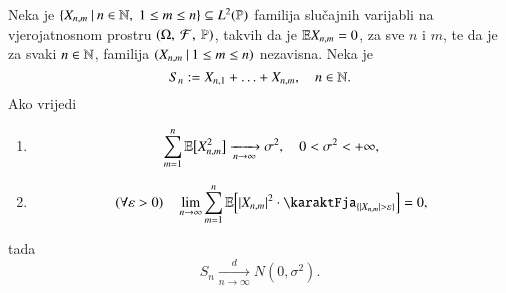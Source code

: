 \begin{tm}  \label{tm:19.4}
    Neka je $\{{X_{n, m}} \: | \: {n \in \mathbb{N}, \; 1 \leq m \leq n}\} \subseteq L^2 (\mathbb{P})$ familija slu\v cajnih varijabli na vjerojatnosnom prostru $(\Omega, \: \mathcal{F}, \: \mathbb{P})$, takvih da je $\mathbb{E} X_{n, m} = 0$, za sve $n$ i $m$, te da je za svaki $n \in \mathbb{N}$, familija $({X_{n, m}} \: | \: { 1 \leq m \leq n})$ nezavisna.
    Neka je
    \begin{equation*}
        S_n := X_{n, 1} + \ldots + X_{n, m}, \quad n \in \mathbb{N}.
    \end{equation*}
    Ako vrijedi
    \begin{enumerate}[label=(\alph*)]
        \item \label{tm:19.4.1}
        \begin{equation*}
            \sum\limits_{m = 1}^{n} \mathbb{E} \big[ X_{n, m}^2 \big] \xrightarrow[n \to \infty]{} \sigma^2, \quad 0 < \sigma^2 < +\infty,
        \end{equation*}
        \item \label{tm:19.4.2}
        \begin{equation*}
            (\forall \varepsilon > 0) \quad \lim\limits_{n \to \infty} \suma{m = 1}{n} \masE \Big[ |X_{n, m}|^2 \cdot \karaktFja_{\{ |X_{n, m}| > \varepsilon \}} \Big] = 0,
        \end{equation*}
    \end{enumerate}
    tada
    \begin{equation*}
        S_n \xrightarrow[n \to \infty]{d}  N (0, \sigma^2).
    \end{equation*}
\end{tm}

